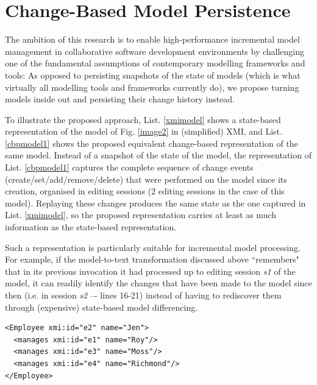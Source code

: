 \documentclass{llncs}
\begin{document}
\section{Change-Based Model Persistence}
\label{Proposed Approach}
The ambition of this research is to enable high-performance incremental model management in collaborative software development environments by challenging one of the fundamental assumptions of contemporary modelling frameworks and tools: As opposed to persisting snapshots of the state of models (which is what virtually all modelling tools and frameworks currently do), we propose turning models inside out and persisting their change history instead.

To illustrate the proposed approach, List. \ref{xmimodel} shows a state-based representation of the model of Fig. \ref{image2} in (simplified) XMI, and List. \ref{cbpmodel1} shows the proposed equivalent change-based representation of the same model. Instead of a snapshot of the state of the model, the representation of List. \ref{cbpmodel1} captures the complete sequence of change events (create/set/add/remove/delete) that were performed on the model since its creation, organised in editing sessions (2 editing sessions in the case of this model). Replaying these changes produces the same state as the one captured in List. \ref{xmimodel}, so the proposed representation carries at least as much information as the state-based representation.

Such a representation is particularly suitable for incremental model processing. For example, if the model-to-text transformation discussed above ``remembers" that in its previous invocation it had processed up to editing session \emph{s1} of the model, it can readily identify the changes that have been made to the model since then (i.e. in session \emph{s2} –- lines 16-21) instead of having to rediscover them through (expensive) state-based model differencing.

\begin{lstlisting}[style=xmi,caption={State-based representation of the model of Figure \ref{image2} in (simplified) XMI.},label=xmimodel]
<Employee xmi:id="e2" name="Jen">
  <manages xmi:id="e1" name="Roy"/>
  <manages xmi:id="e3" name="Moss"/>
  <manages xmi:id="e4" name="Richmond"/>
</Employee>
\end{lstlisting}
\end{document}
